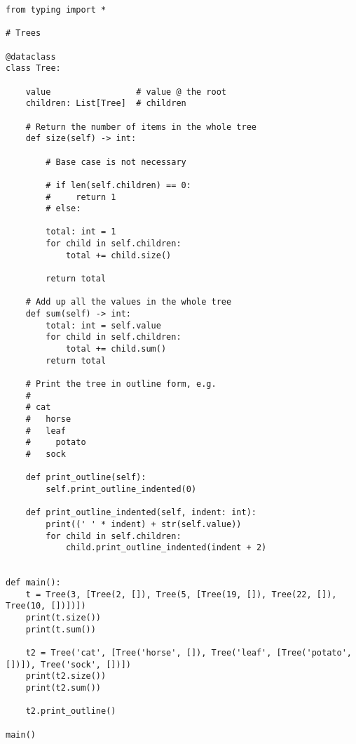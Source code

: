 \documentclass{article}
\newenvironment{reflect}[1]
{
  \noindent
  \begin{lrbox}{\reflectbox}
    \begin{minipage}[t]{\textwidth}
      \textbf{#1}:
}{
    \end{minipage}
  \end{lrbox}
  \fbox{\usebox{\reflectbox}}
}
\newcommand{\notready}{\textcolor{red}{\XSolidBold}\xspace}
\begin{document}
\begin{verbatim}
from typing import *

# Trees

@dataclass
class Tree:

    value                 # value @ the root
    children: List[Tree]  # children

    # Return the number of items in the whole tree
    def size(self) -> int:

        # Base case is not necessary

        # if len(self.children) == 0:
        #     return 1
        # else:

        total: int = 1
        for child in self.children:
            total += child.size()

        return total

    # Add up all the values in the whole tree
    def sum(self) -> int:
        total: int = self.value
        for child in self.children:
            total += child.sum()
        return total

    # Print the tree in outline form, e.g.
    #
    # cat
    #   horse
    #   leaf
    #     potato
    #   sock

    def print_outline(self):
        self.print_outline_indented(0)

    def print_outline_indented(self, indent: int):
        print((' ' * indent) + str(self.value))
        for child in self.children:
            child.print_outline_indented(indent + 2)


def main():
    t = Tree(3, [Tree(2, []), Tree(5, [Tree(19, []), Tree(22, []), Tree(10, [])])])
    print(t.size())
    print(t.sum())

    t2 = Tree('cat', [Tree('horse', []), Tree('leaf', [Tree('potato', [])]), Tree('sock', [])])
    print(t2.size())
    print(t2.sum())

    t2.print_outline()

main()
\end{verbatim}


\end{document}
